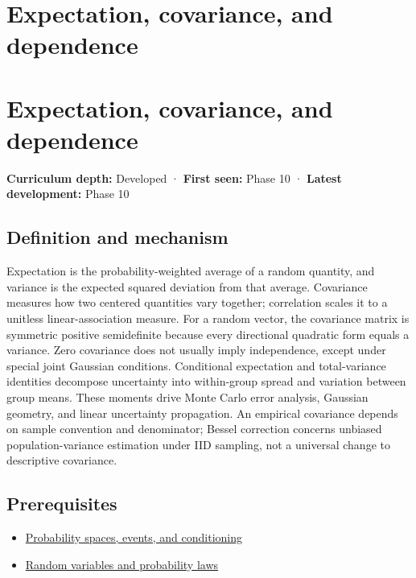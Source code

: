 \hypertarget{appendix-54c383df9992}{}
\section*{Expectation, covariance, and dependence}
\section{Expectation, covariance, and dependence}\label{expectation-covariance-and-dependence}

\textbf{Curriculum depth:} Developed · \textbf{First seen:} Phase 10 · \textbf{Latest development:} Phase 10

\subsection{Definition and mechanism}\label{definition-and-mechanism}

Expectation is the probability-weighted average of a random quantity, and variance is the expected squared deviation from that average. Covariance measures how two centered quantities vary together; correlation scales it to a unitless linear-association measure. For a random vector, the covariance matrix is symmetric positive semidefinite because every directional quadratic form equals a variance. Zero covariance does not usually imply independence, except under special joint Gaussian conditions. Conditional expectation and total-variance identities decompose uncertainty into within-group spread and variation between group means. These moments drive Monte Carlo error analysis, Gaussian geometry, and linear uncertainty propagation. An empirical covariance depends on sample convention and denominator; Bessel correction concerns unbiased population-variance estimation under IID sampling, not a universal change to descriptive covariance.

\subsection{Prerequisites}\label{prerequisites}

\begin{itemize}
\tightlist
\item
  \hyperref[appendix-f1ef323f6ed7]{Probability spaces, events, and conditioning}
\item
  \hyperref[appendix-4d0203f7944f]{Random variables and probability laws}
\end{itemize}

